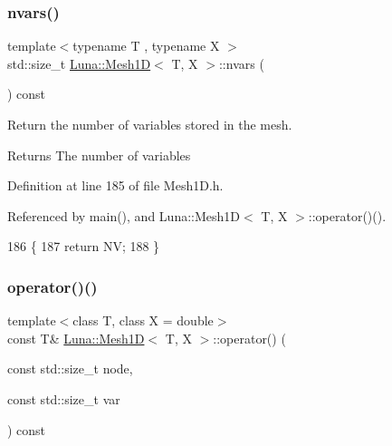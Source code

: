 \subsubsection{\texorpdfstring{nvars()}{nvars()}}
{\footnotesize\ttfamily template$<$typename T , typename X $>$ \\
std\+::size\+\_\+t \hyperlink{classLuna_1_1Mesh1D}{Luna\+::\+Mesh1D}$<$ T, X $>$\+::nvars (\begin{DoxyParamCaption}{ }\end{DoxyParamCaption}) const\hspace{0.3cm}{\ttfamily [inline]}}



Return the number of variables stored in the mesh. 

\begin{DoxyReturn}{Returns}
The number of variables 
\end{DoxyReturn}


Definition at line 185 of file Mesh1\+D.\+h.



Referenced by main(), and Luna\+::\+Mesh1\+D$<$ T, X $>$\+::operator()().


\begin{DoxyCode}
186   \{
187     \textcolor{keywordflow}{return} NV;
188   \}
\end{DoxyCode}
\mbox{\label{classLuna_1_1Mesh1D_a948c14c9fb7ac229a110910015e60ac8}} 
\subsubsection{\texorpdfstring{operator()()}{operator()()}\hspace{0.1cm}{\footnotesize\ttfamily [1/2]}}
{\footnotesize\ttfamily template$<$class T, class X = double$>$ \\
const T\& \hyperlink{classLuna_1_1Mesh1D}{Luna\+::\+Mesh1D}$<$ T, X $>$\+::operator() (\begin{DoxyParamCaption}\item[{const std\+::size\+\_\+t}]{node,  }\item[{const std\+::size\+\_\+t}]{var }\end{DoxyParamCaption}) const\hspace{0.3cm}{\ttfamily [inline]}}




